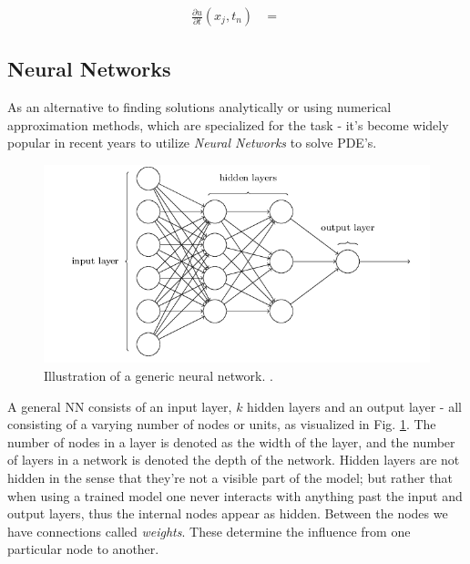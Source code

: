 \begin{align}
    \frac{\partial u}{\partial t}(x_j, t_n) &= \frac{}{}
\end{align}


\subsection{Neural Networks } 

As an alternative to finding solutions analytically or using numerical approximation methods, which are specialized for the task - it's become widely popular in recent years to utilize \textit{Neural Networks} to solve PDE's.


\begin{figure}[H]
    \centering
    \includegraphics[width=1\linewidth]{project_2/figures/generic_NN.png}
    \caption{Illustration of a generic neural network. \cite[Taken from][Ch.1]{nielsen}.}
    \label{fig:NN}
\end{figure}

A general NN consists of an input layer, $k$ hidden layers and an output layer - all consisting of a varying number of nodes or units, as visualized in Fig. \ref{fig:NN}. The number of nodes in a layer is denoted as the width of the layer, and the number of layers in a network is denoted the depth of the network. 
Hidden layers are not hidden in the sense that they're not a visible part of the model; but rather that when using a trained model one never interacts with anything past the input and output layers, thus the internal nodes appear as hidden. 
Between the nodes we have connections called \textit{weights}. These determine the influence from one particular node to another. 


